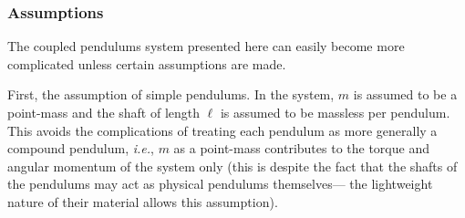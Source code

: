 \documentclass[12pt]{article}
\begin{document}
\begin{multicols}{2}
\subsubsection{Assumptions}
The coupled pendulums system presented here can easily become more complicated unless certain assumptions are made.

First, the assumption of simple pendulums. In the system, $m$ is assumed to be a point-mass and the shaft of length $\ell$ is assumed to be massless per pendulum.
This avoids the complications of treating each pendulum as more generally a compound pendulum, \textit{i.e.}, $m$ as a point-mass contributes to the torque and angular momentum of the system only
(this is despite the fact that the shafts of the pendulums may act as physical pendulums themselves--- the lightweight nature of their material allows this assumption).


\end{multicols}
\end{document}
